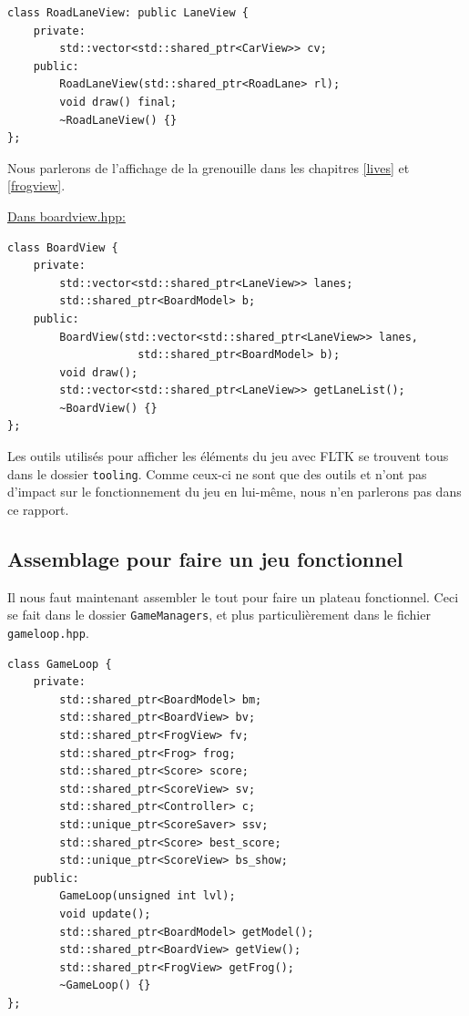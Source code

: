 \documentclass[a4paper, 12pt]{article}
\begin{document}
\begin{lstlisting}
class RoadLaneView: public LaneView {
    private:
        std::vector<std::shared_ptr<CarView>> cv;
    public:
        RoadLaneView(std::shared_ptr<RoadLane> rl);
        void draw() final;
        ~RoadLaneView() {}
};
\end{lstlisting}

Nous parlerons de l'affichage de la grenouille dans les chapitres 
\ref{lives} et \ref{frogview}. \\

\pagebreak

\underline{Dans boardview.hpp:}

\begin{lstlisting}
class BoardView {
    private:
        std::vector<std::shared_ptr<LaneView>> lanes;
        std::shared_ptr<BoardModel> b;
    public:
        BoardView(std::vector<std::shared_ptr<LaneView>> lanes,
                    std::shared_ptr<BoardModel> b);
        void draw();
        std::vector<std::shared_ptr<LaneView>> getLaneList();
        ~BoardView() {}
};
\end{lstlisting}

Les outils utilisés pour afficher les éléments du jeu avec FLTK se trouvent tous 
dans le dossier \texttt{tooling}. 
Comme ceux-ci ne sont que des outils et n'ont pas d'impact sur le fonctionnement 
du jeu en lui-même, 
nous n'en parlerons pas dans ce rapport.

\subsection{Assemblage pour faire un jeu fonctionnel}

Il nous faut maintenant assembler le tout pour faire un plateau fonctionnel. 
Ceci se fait dans le dossier \texttt{GameManagers}, et plus particulièrement 
dans le fichier \texttt{gameloop.hpp}. 

\begin{lstlisting}
class GameLoop {
    private:
        std::shared_ptr<BoardModel> bm;
        std::shared_ptr<BoardView> bv;
        std::shared_ptr<FrogView> fv;
        std::shared_ptr<Frog> frog;
        std::shared_ptr<Score> score;
        std::shared_ptr<ScoreView> sv;
        std::shared_ptr<Controller> c;
        std::unique_ptr<ScoreSaver> ssv;
        std::shared_ptr<Score> best_score;
        std::unique_ptr<ScoreView> bs_show;
    public:
        GameLoop(unsigned int lvl);
        void update();
        std::shared_ptr<BoardModel> getModel();
        std::shared_ptr<BoardView> getView();
        std::shared_ptr<FrogView> getFrog();
        ~GameLoop() {}
};
\end{lstlisting}
\end{document}
